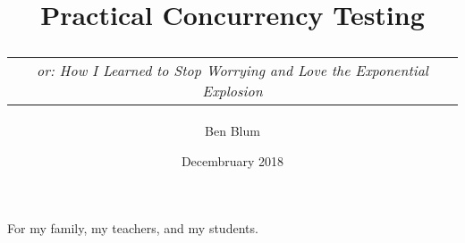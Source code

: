 \documentclass[12pt]{cmuthesis}
\begin{document}
\frontmatter

\pagestyle{empty}

\title{ %
{\bf Practical Concurrency Testing} \\
\normalsize \vspace{1em}
\begin{tabular}{c}
{\em or: How I Learned to Stop Worrying and Love the Exponential Explosion}
\end{tabular}}
\author{Ben Blum}
\date{Decembruary 2018}
\trnumber{}


\support{}
\disclaimer{}



\maketitle

\begin{dedication}
For my family, my teachers, and my students.
\end{dedication}

\pagestyle{plain} %
\end{document}
